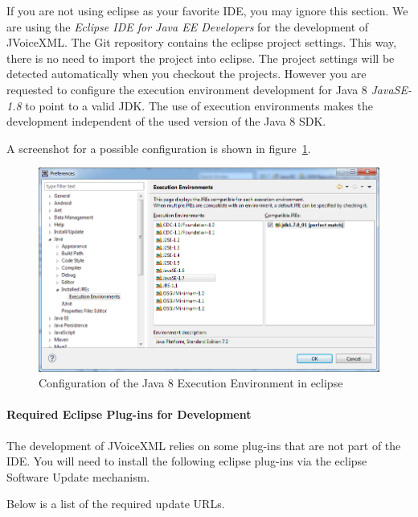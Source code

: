 \documentclass[11pt,a4paper]{article}
\begin{document}
If you are not using eclipse as your favorite IDE, you may ignore this section.
We are using the \emph{Eclipse IDE for Java EE Developers}
for the development of JVoiceXML. The Git repository contains the eclipse
project settings. This way, there is no need to import the
project into eclipse. The project settings will be detected 
automatically when you checkout the projects. However you are requested to configure the execution
environment development for Java 8 \emph{JavaSE-1.8} to point to a valid JDK.
The use of execution environments makes the development independent of the
used version of the Java 8 SDK.

A screenshot for a possible configuration is shown in
figure~\ref{fig:eclipse-execution-environments}.
\begin{figure}
\includegraphics[width=\linewidth]{eclipse-execution-environments}
\caption{Configuration of the Java 8 Execution Environment in eclipse}
\label{fig:eclipse-execution-environments}
\end{figure}

\paragraph{Required Eclipse Plug-ins for Development}

The development of JVoiceXML relies on some plug-ins that are not part of the
IDE. You will need to install the following eclipse plug-ins via the eclipse
Software Update mechanism.

Below is a list of the required update URLs.
\end{document}
